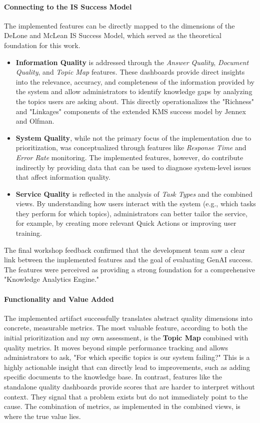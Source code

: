 \documentclass[
	english,
	ruledheaders=section,%
	class=report,%
	thesis={type=bachelor},%
	accentcolor=1b,%
	custommargins=true,%
	marginpar=false,%
	parskip=half-,%
	fontsize=11pt,%
	DIV=14,
]{tudapub}
\begin{document}
\paragraph{Connecting to the IS Success Model} The implemented features can be directly mapped to the dimensions of the DeLone and McLean IS Success Model, which served as the theoretical foundation for this work.
\begin{itemize}
    \item \textbf{Information Quality} is addressed through the \textit{Answer Quality}, \textit{Document Quality}, and \textit{Topic Map} features. These dashboards provide direct insights into the relevance, accuracy, and completeness of the information provided by the system and allow administrators to identify knowledge gaps by analyzing the topics users are asking about. This directly operationalizes the "Richness" and "Linkages" components of the extended KMS success model by Jennex and Olfman.
    \item \textbf{System Quality}, while not the primary focus of the implementation due to prioritization, was conceptualized through features like \textit{Response Time} and \textit{Error Rate} monitoring. The implemented features, however, do contribute indirectly by providing data that can be used to diagnose system-level issues that affect information quality.
    \item \textbf{Service Quality} is reflected in the analysis of \textit{Task Types} and the combined views. By understanding how users interact with the system (e.g., which tasks they perform for which topics), administrators can better tailor the service, for example, by creating more relevant Quick Actions or improving user training.
\end{itemize}
The final workshop feedback confirmed that the development team saw a clear link between the implemented features and the goal of evaluating GenAI success. The features were perceived as providing a strong foundation for a comprehensive "Knowledge Analytics Engine."

\paragraph{Functionality and Value Added} The implemented artifact successfully translates abstract quality dimensions into concrete, measurable metrics. The most valuable feature, according to both the initial prioritization and my own assessment, is the \textbf{Topic Map} combined with quality metrics. It moves beyond simple performance tracking and allows administrators to ask, "For which specific topics is our system failing?" This is a highly actionable insight that can directly lead to improvements, such as adding specific documents to the knowledge base. In contrast, features like the standalone quality dashboards provide scores that are harder to interpret without context. They signal that a problem exists but do not immediately point to the cause. The combination of metrics, as implemented in the combined views, is where the true value lies.
\end{document}
